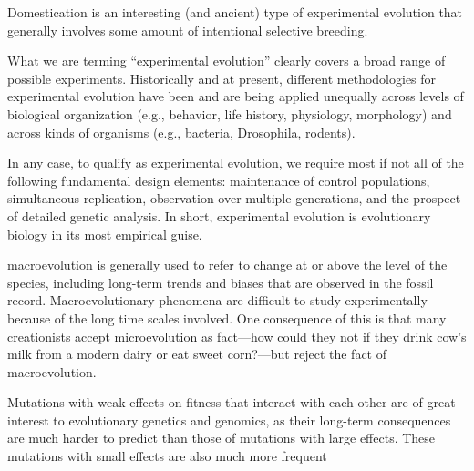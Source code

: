 Domestication is an interesting (and ancient) type of experimental evolution that generally involves some amount of intentional selective breeding.

What we are terming “experimental evolution” clearly covers a broad range of possible experiments. Historically and at present, different methodologies for experimental evolution have been and are being applied unequally across levels of biological organization (e.g., behavior, life history, physiology, morphology) and across kinds of organisms (e.g., bacteria, Drosophila, rodents).

In any case, to qualify as experimental evolution, we require most if not all of the following fundamental design elements: maintenance of control populations, simultaneous replication, observation over multiple generations, and the prospect of detailed genetic analysis. In short, experimental evolution is evolutionary biology in its most
empirical guise.

macroevolution is generally used to refer to change at or above the level of the species, including long-term trends and biases that are observed in the fossil record. Macroevolutionary phenomena are difficult to study experimentally because of the long time scales involved. One consequence of this is that many creationists accept microevolution as fact—how could they not if they drink cow’s milk from a modern dairy or eat sweet corn?—but reject the fact
of macroevolution.


\cite{loewe2009framework}
Mutations with weak effects on fitness that interact with each other are of great interest to evolutionary genetics and genomics, as their long-term consequences are much harder to predict than those of mutations with large effects. These mutations with small effects are also much more frequent


